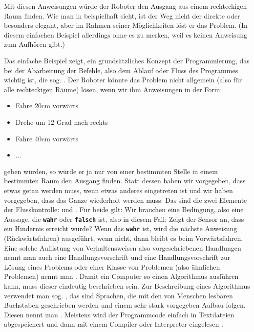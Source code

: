 Mit diesen Anweisungen würde der Roboter den Ausgang aus einem rechteckigen Raum finden. Wie man in 
 beispielhaft sieht, ist der Weg nicht der direkte oder besonders elegant, aber im Rahmen seiner Möglichkeiten löst er das Problem. 
(In diesem einfachen Beispiel allerdings ohne es zu merken, weil es keinen Anweisung zum Aufhören gibt.)



Das einfache Beispiel zeigt, ein grundsätzliches Konzept der Programmierung, das bei der Abarbeitung der Befehle, also dem Ablauf oder Fluss des Programmes 
wichtig ist, die sog. . Der Roboter könnte das Problem nicht allgemein (also für alle rechteckigen Räume) lösen, wenn wir ihm Anweisungen 
in der Form: 
\begin{itemize}
\item Fahre 20cm vorwärts
\item Drehe um 12 Grad nach rechts
\item Fahre 40cm vorwärts
\item ...
\end{itemize}
geben würden, so würde er ja nur von einer bestimmten Stelle in einem bestimmten Raum den Ausgang finden. Statt dessen haben wir vorgegeben, dass etwas 
getan werden muss, wenn etwas anderes eingetreten ist und wir haben vorgegeben, dass das Ganze wiederholt werden muss.
Das sind die zwei Elemente der Flusskontrolle:  und .
Für beide gilt: Wir brauchen eine Bedingung, also eine Aussage, die \texttt{\textbf{wahr}} oder \texttt{\textbf{falsch}} ist, also in diesem Fall: 
Zeigt der Sensor an, dass ein Hindernis erreicht wurde? Wenn das \texttt{\textbf{wahr}} ist, wird die nächste Anweisung (Rückwärtsfahren) ausgeführt, 
wenn nicht, dann bleibt es beim Vorwärtsfahren.
Eine solche Auflistung von Verhaltensweisen also vorgeschriebenen Handlungen nennt man auch eine Handlungsvorschrift und eine Handlungsvorschrift zur Lösung 
eines Problems oder einer Klasse von Problemen (also ähnlichen Problemen) nennt man . Damit ein Computer so einen Algorithmus ausführen kann, 
muss dieser eindeutig beschrieben sein. Zur Beschreibung eines Algorithmus verwendet man sog. , das sind Sprachen, die mit 
den von Menschen lesbaren Buchstaben geschrieben werden und einem sehr stark vorgegeben Aufbau folgen. Diesen nennt man . 
Meistens wird der Programmcode einfach in Textdateien abgespeichert und dann mit einem Compiler oder Interpreter eingelesen . 

